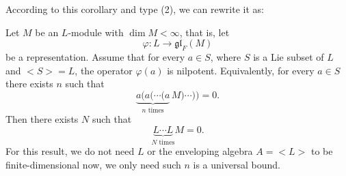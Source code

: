\begin{remark}
    According to this corollary and type (2), we can rewrite it as:

    Let $M$ be an $L$-module with $\dim M<\infty$, that is, let
    \[
        \varphi:L\to \mathfrak{gl}_F(M)
    \]
    be a representation. Assume that for every $a\in S$, where $S$ is a Lie subset of $L$ and $<S>=L$, the operator $\varphi(a)$ is nilpotent. Equivalently, for every $a\in S$ there exists $n$ such that
    \[
        \underbrace{a\bigl(a(\cdots(a}_{n\text{ times}}\,M)\cdots)\bigr)=0.
    \]
    Then there exists $N$ such that
    \[
        \underbrace{L\cdots L}_{N\text{ times}}M=0.
    \]
    For this result, we do not need $L$ or the enveloping algebra $A=<L>$ to be finite-dimensional now, we only need such $n$ is a universal bound.
\end{remark}

